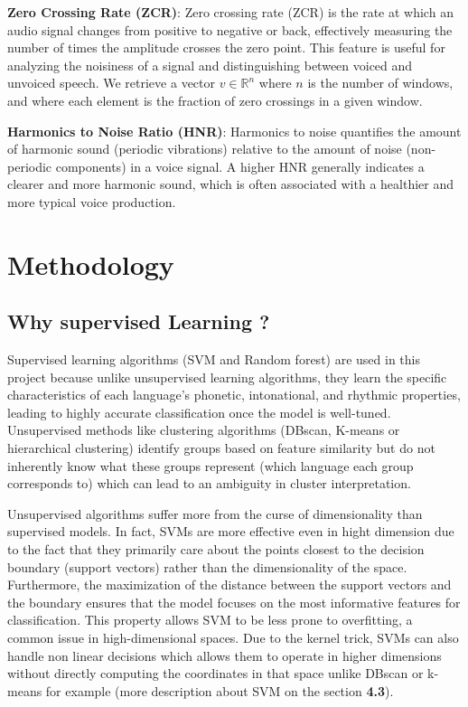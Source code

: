 \documentclass[twocolumn]{article}
\newcommand{\R}{\mathbb{R}}
\begin{document}
\textbf{Zero Crossing Rate (ZCR)}: Zero crossing rate (ZCR) is the rate at which an audio signal changes from positive to negative or back, effectively measuring the number of times the amplitude crosses the zero point. This feature is useful for analyzing the noisiness of a signal and distinguishing between voiced and unvoiced speech. We retrieve a vector $v \in \R^{n}$ where $n$ is the number of windows, and where each element is the fraction of zero crossings in a given window.

\textbf{Harmonics to Noise Ratio (HNR)}:
Harmonics to noise quantifies the amount of harmonic sound (periodic vibrations) relative to the amount of noise (non-periodic components) in a voice signal. A higher HNR generally indicates a clearer and more harmonic sound, which is often associated with a healthier and more typical voice production. 

\section{Methodology}
\subsection{Why supervised Learning ?}
Supervised learning algorithms (SVM and Random forest) are used in this project because unlike unsupervised learning algorithms, they learn the specific characteristics of each language’s phonetic, intonational, and rhythmic properties, leading to highly accurate classification once the model is well-tuned. Unsupervised methods like clustering algorithms (DBscan, K-means or hierarchical clustering) identify groups based on feature similarity but do not inherently know what these groups represent (which language each group corresponds to) which can lead to an ambiguity in cluster interpretation.

Unsupervised algorithms suffer more from the curse of dimensionality than supervised models. In fact, SVMs are more effective even in hight dimension due to the fact that they primarily care about the points closest to the decision boundary (support vectors) rather than the dimensionality of the space. Furthermore, the maximization of the distance between the support vectors and the boundary ensures that the model focuses on the most informative features for classification. This property allows SVM to be less prone to overfitting, a common issue in high-dimensional spaces. Due to the kernel trick, SVMs can also handle non linear decisions which allows them to operate in higher dimensions without directly computing the coordinates in that space unlike DBscan or k-means for example (more description about SVM on the section \textbf{4.3}).
\end{document}
